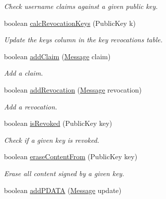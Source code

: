 \begin{DoxyCompactItemize}
\begin{DoxyCompactList}\small\item\em Check username claims against a given public key. \end{DoxyCompactList}\item 
boolean \hyperlink{classballmerpeak_1_1turtlenet_1_1server_1_1Database_a222ba2352c2b9c48dd9c66470d106623}{calc\-Revocation\-Keys} (Public\-Key k)
\begin{DoxyCompactList}\small\item\em Update the keys column in the key revocations table. \end{DoxyCompactList}\item 
boolean \hyperlink{classballmerpeak_1_1turtlenet_1_1server_1_1Database_afc065fd588fdbd556bd2a013e648b43d}{add\-Claim} (\hyperlink{classballmerpeak_1_1turtlenet_1_1shared_1_1Message}{Message} claim)
\begin{DoxyCompactList}\small\item\em Add a claim. \end{DoxyCompactList}\item 
boolean \hyperlink{classballmerpeak_1_1turtlenet_1_1server_1_1Database_ac4eeb9a2d74bd6cfe1e72f63fc93243b}{add\-Revocation} (\hyperlink{classballmerpeak_1_1turtlenet_1_1shared_1_1Message}{Message} revocation)
\begin{DoxyCompactList}\small\item\em Add a revocation. \end{DoxyCompactList}\item 
boolean \hyperlink{classballmerpeak_1_1turtlenet_1_1server_1_1Database_ab3e267a71350c940b476949722eda0eb}{is\-Revoked} (Public\-Key key)
\begin{DoxyCompactList}\small\item\em Check if a given key is revoked. \end{DoxyCompactList}\item 
boolean \hyperlink{classballmerpeak_1_1turtlenet_1_1server_1_1Database_a6b4d12d2583d01113c6ba154a94261af}{erase\-Content\-From} (Public\-Key key)
\begin{DoxyCompactList}\small\item\em Erase all content signed by a given key. \end{DoxyCompactList}\item 
boolean \hyperlink{classballmerpeak_1_1turtlenet_1_1server_1_1Database_a051ccb269be2f30af05fe554b83597a5}{add\-P\-D\-A\-T\-A} (\hyperlink{classballmerpeak_1_1turtlenet_1_1shared_1_1Message}{Message} update)

\end{DoxyCompactItemize}

